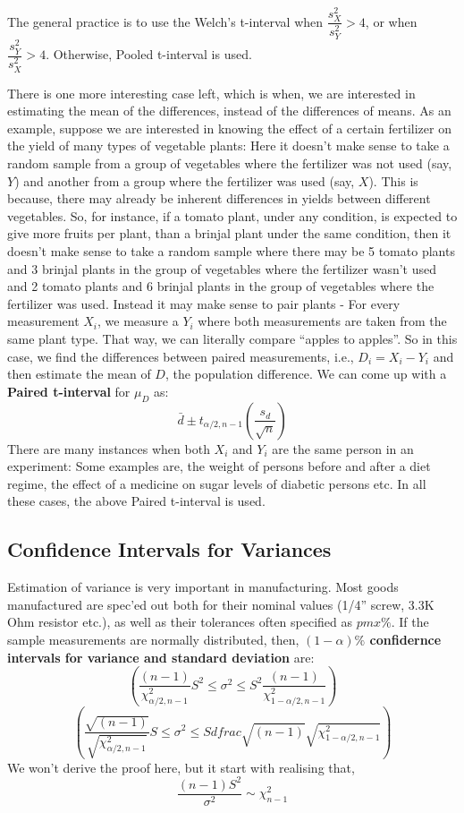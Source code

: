 The general practice is to use the Welch's t-interval when \(\dfrac{s^2_X}{s^2_Y} > 4\), or when \(\dfrac{s^2_Y}{s^2_X} > 4\). Otherwise, Pooled t-interval is used.

There is one more interesting case left, which is when, we are interested in estimating the mean of the differences, instead of the differences of means. As an example, suppose we are interested in knowing the effect of a certain fertilizer on the yield of many types of vegetable plants: Here it doesn't make sense to take a random sample from a group of vegetables where the fertilizer was not used (say, $Y$) and another from a group where the fertilizer was used (say, $X$). This is because, there may already be inherent differences in yields between different vegetables. So, for instance, if a tomato plant, under any condition, is expected to give more fruits per plant, than a brinjal plant under the same condition, then it doesn't make sense to take a random sample where there may be 5 tomato plants and 3 brinjal plants in the group of vegetables where the fertilizer wasn't used and 2 tomato plants and 6 brinjal plants in the group of vegetables where the fertilizer was used. Instead it may make sense to pair plants - For every measurement $X_i$, we measure a $Y_i$ where both measurements are taken from the same plant type. That way, we can literally compare ``apples to apples''. So in this case, we find the differences between paired measurements, i.e., \( D_i = X_i - Y_i \) and then estimate the mean of $D$, the population difference. We can come up with a \textbf{Paired t-interval} for $\mu_D$ as:
	\[ \bar{d} \pm t_{\alpha/2,n-1}\left(\dfrac{s_d}{\sqrt{n}}\right) \]
There are many instances when both $X_i$ and $Y_i$ are the same person in an experiment: Some examples are, the weight of persons before and after a diet regime, the effect of a medicine on sugar levels of diabetic persons etc. In all these cases, the above Paired t-interval is used.

\subsection {Confidence Intervals for Variances}
Estimation of variance is very important in manufacturing. Most goods manufactured are spec'ed out both for their nominal values (1/4'' screw, 3.3K Ohm resistor etc.), as well as their tolerances often specified as $pm x\%$. If the sample measurements are normally distributed, then, \textbf{\((1-\alpha)\%\) confidernce intervals for variance and standard deviation} are:
	\[ \left(\dfrac{(n-1)}{\chi^2_{\alpha/2,n-1}} S^2 \leq \sigma^2 \leq S^2\dfrac{(n-1)}{\chi^2_{1-\alpha/2,n-1}}\right) \]
	\[ \left(\dfrac{\sqrt{(n-1)}}{\sqrt{\chi^2_{\alpha/2,n-1}}} S \leq \sigma^2 \leq S dfrac{\sqrt{(n-1)}}{\sqrt{\chi^2_{1-\alpha/2,n-1}}}\right) \]
We won't derive the proof here, but it start with realising that, 
	\[ \frac{(n-1)S^2}{\sigma^2} \sim \chi^2_{n-1} \]
	
